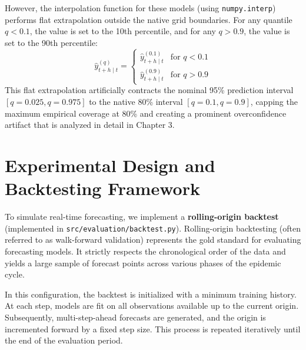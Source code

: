 \begin{itemize}
    However, the interpolation function for these models (using \texttt{numpy.interp}) performs flat extrapolation outside the native grid boundaries. For any quantile $q < 0.1$, the value is set to the 10th percentile, and for any $q > 0.9$, the value is set to the 90th percentile:
    \begin{equation}
    \hat{y}_{t+h\mid t}^{(q)} = \begin{cases}
    \hat{y}_{t+h\mid t}^{(0.1)} & \text{for } q < 0.1 \\
    \hat{y}_{t+h\mid t}^{(0.9)} & \text{for } q > 0.9
    \end{cases}
    \end{equation}
    This flat extrapolation artificially contracts the nominal 95\% prediction interval $[q=0.025, q=0.975]$ to the native 80\% interval $[q=0.1, q=0.9]$, capping the maximum empirical coverage at 80\% and creating a prominent overconfidence artifact that is analyzed in detail in Chapter 3.
\end{itemize}


\section{Experimental Design and Backtesting Framework}

To simulate real-time forecasting, we implement a \textbf{rolling-origin backtest} (implemented in \texttt{src/evaluation/backtest.py}). Rolling-origin backtesting (often referred to as walk-forward validation) represents the gold standard for evaluating forecasting models. It strictly respects the chronological order of the data and yields a large sample of forecast points across various phases of the epidemic cycle.

In this configuration, the backtest is initialized with a minimum training history. At each step, models are fit on all observations available up to the current origin. Subsequently, multi-step-ahead forecasts are generated, and the origin is incremented forward by a fixed step size. This process is repeated iteratively until the end of the evaluation period.

